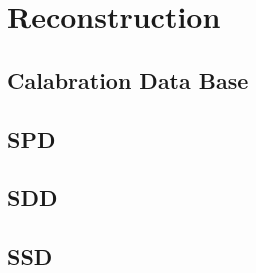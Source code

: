 \chapter{Reconstruction}

\section{Calabration Data Base}

\section{SPD}

\section{SDD}

\section{SSD}

